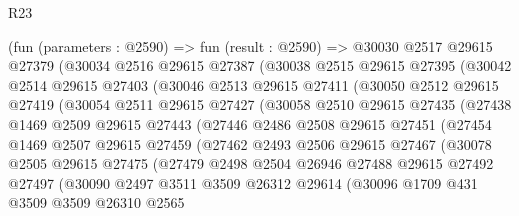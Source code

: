 \begin{lexlean}{R23}
\begin{coremodule}
        (fun (parameters : @2590) =>
        fun (result : @2590) =>
        @30030
          @2517
          @29615
          @27379
          (@30034
            @2516
            @29615
            @27387
            (@30038
              @2515
              @29615
              @27395
              (@30042
                @2514
                @29615
                @27403
                (@30046
                  @2513
                  @29615
                  @27411
                  (@30050
                    @2512
                    @29615
                    @27419
                    (@30054
                      @2511
                      @29615
                      @27427
                      (@30058
                        @2510
                        @29615
                        @27435
                        (@27438
                          @1469
                          @2509
                          @29615
                          @27443
                          (@27446
                            @2486
                            @2508
                            @29615
                            @27451
                            (@27454
                              @1469
                              @2507
                              @29615
                              @27459
                              (@27462
                                @2493
                                @2506
                                @29615
                                @27467
                                (@30078
                                  @2505
                                  @29615
                                  @27475
                                  (@27479
                                    @2498
                                    @2504
                                    @26946
                                    @27488
                                    @29615
                                    @27492
                                    @27497
                                    (@30090
                                      @2497
                                      @3511
                                      @3509
                                      @26312
                                      @29614
                                      (@30096
                                        @1709
                                        @431
                                        @3509
                                        @3509
                                        @26310
                                        @2565

\end{coremodule}
\end{lexlean}
